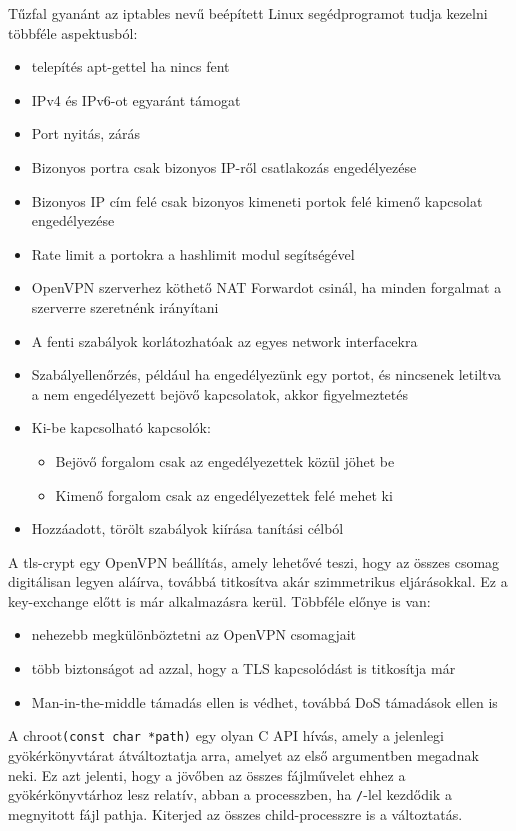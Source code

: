 Tűzfal gyanánt az iptables nevű beépített Linux segédprogramot tudja kezelni többféle aspektusból:
\begin{itemize}
	\item telepítés apt-gettel ha nincs fent
	\item IPv4 és IPv6-ot egyaránt támogat
	\item Port nyitás, zárás
	\item Bizonyos portra csak bizonyos IP-ről csatlakozás engedélyezése
	\item Bizonyos IP cím felé csak bizonyos kimeneti portok felé kimenő kapcsolat engedélyezése
	\item Rate limit a portokra a hashlimit modul segítségével
	\item OpenVPN szerverhez köthető NAT Forwardot csinál, ha minden forgalmat a szerverre szeretnénk irányítani
	\item A fenti szabályok korlátozhatóak az egyes network interfacekra
	\item Szabályellenőrzés, például ha engedélyezünk egy portot, és nincsenek letiltva a nem engedélyezett bejövő kapcsolatok, akkor figyelmeztetés
	\item Ki-be kapcsolható kapcsolók:
		\begin{itemize}
			\item Bejövő forgalom csak az engedélyezettek közül jöhet be
			\item Kimenő forgalom csak az engedélyezettek felé mehet ki
		\end{itemize}
	\item Hozzáadott, törölt szabályok kiírása tanítási célból
\end{itemize}

 \label{ref:tls-crypt}
A tls-crypt egy OpenVPN beállítás, amely lehetővé teszi, hogy az összes csomag digitálisan legyen aláírva, továbbá titkosítva akár szimmetrikus eljárásokkal. Ez a key-exchange előtt is már alkalmazásra kerül. \cite{openvpnmanual}
Többféle előnye is van:
\begin{itemize}
	\item nehezebb megkülönböztetni az OpenVPN csomagjait
	\item több biztonságot ad azzal, hogy a TLS kapcsolódást is titkosítja már
	\item Man-in-the-middle támadás ellen is védhet, továbbá DoS támadások ellen is
\end{itemize}

 \label{ref:chroot}
A chroot\texttt{(const char *path)} egy olyan C API hívás, amely a jelenlegi gyökérkönyvtárat átváltoztatja arra, amelyet az első argumentben megadnak neki. Ez azt jelenti, hogy a jövőben az összes fájlművelet ehhez a gyökérkönyvtárhoz lesz relatív, abban a processzben, ha \texttt{/}-lel kezdődik a megnyitott fájl pathja. Kiterjed az összes child-processzre is a változtatás. \cite{chroot}

